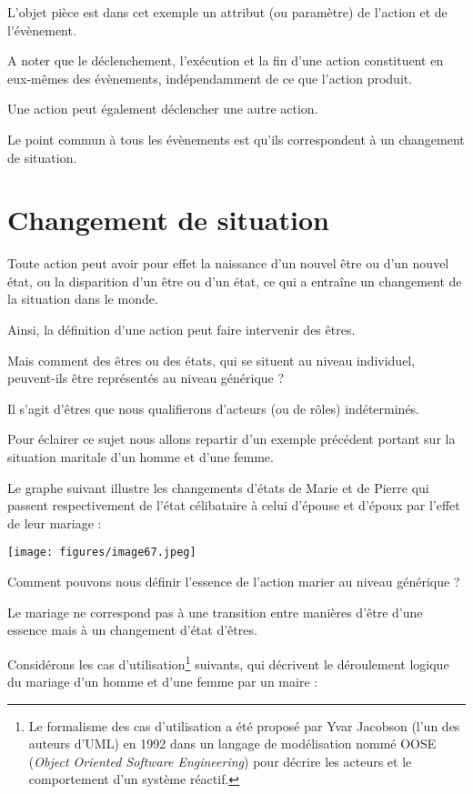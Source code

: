 \documentclass[a4paper, 12pt, openright, french]{book}
\begin{document}
L'objet pièce est dans cet exemple un attribut (ou
paramètre) de l'action et de
l'évènement.

A noter que le déclenchement, l'exécution et la fin
d'une action constituent en eux-mêmes des évènements,
indépendamment de ce que l'action produit.

Une action peut également déclencher une autre action.

Le point commun à tous les évènements est qu'ils
correspondent à un changement de situation.



\section{Changement de situation}

Toute action peut avoir pour effet la naissance d'un
nouvel être ou d'un nouvel état, ou la disparition
d'un être ou d'un état, ce qui a
entraîne un changement de la situation dans le monde.

Ainsi, la définition d'une action peut faire intervenir
des êtres.

Mais comment des êtres ou des états, qui se situent au niveau
individuel, peuvent-ils être représentés au niveau générique ?

Il s'agit d'êtres que nous qualifierons
d'acteurs (ou de rôles) indéterminés.

Pour éclairer ce sujet nous allons repartir d'un exemple
précédent portant sur la situation maritale d'un homme
et d'une femme.

Le graphe suivant illustre les changements d'états de
Marie et de Pierre qui passent respectivement de l'état
célibataire à celui d'épouse et d'époux
par l'effet de leur mariage :

\texttt{[image: figures/image67.jpeg]}

Comment pouvons nous définir l'essence de
l'action marier au niveau générique ?

Le mariage ne correspond pas à une transition entre manières
d'être d'une essence mais à un
changement d'état d'êtres.

Considérons les cas d'utilisation\footnote{Le formalisme des cas d'utilisation
	a été proposé par Yvar Jacobson (l'un des auteurs
	d'UML) en 1992 dans un langage de modélisation nommé
	OOSE (\emph{Object Oriented Software Engineering}) pour décrire les
	acteurs et le comportement d'un système réactif.}
suivants, qui décrivent le déroulement logique du mariage
d'un homme et d'une femme par un maire :
\end{document}
